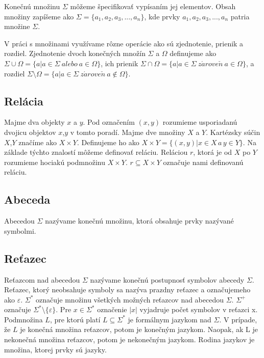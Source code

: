 Konečnú množinu $\Sigma$ môžeme špecifikovať vypísaním jej elementov. Obsah množiny zapíšeme ako $\Sigma = \{a_1, a_2, a_3, ..., a_n\}$, kde prvky $a_1, a_2, a_3, ..., a_n$ patria množine $\Sigma$.

V práci s množinami využívame rôzne operácie ako sú zjednotenie, prienik a rozdiel. Zjednotenie dvoch konečných množín $\Sigma$ a $\Omega$ definujeme ako $\Sigma \cup \Omega = \{a | a \in \Sigma \: alebo  \: a \in \Omega \}$, ich prienik $\Sigma \cap \Omega = \{a | a \in \Sigma \: z\acute{a}rove\check{n}  \: a \in \Omega \}$, a rozdiel $\Sigma \setminus \Omega = \{a | a \in \Sigma \: z\acute{a}rove\check{n}  \: a \not \in \Omega \}$.

\subsection{Relácia}
Majme dva objekty $x$ a $y$. Pod označením $(x,y)$ rozumieme usporiadanú dvojicu objektov $x$,$y$ v tomto poradí. Majme dve množiny $X$ a $Y$. Kartézsky súčin $X$,$Y$ značíme ako $X \times Y$. Definujeme ho ako $X \times Y = \{(x,y) | x \in X \, a \, y \in Y\}$. Na základe týchto znalostí môžeme definovať reláciu. Reláciou $r$, ktorá je od $X$ po $Y$ rozumieme hociakú podmnožinu $X \times Y$. $r \subseteq X \times Y$ označuje nami definovanú reláciu.

\subsection{Abeceda}
Abecedou $\Sigma$ nazývame konečnú množinu, ktorá obsahuje prvky nazývané symbolmi.

\subsection{Reťazec}
Reťazcom nad abecedou $\Sigma$ nazývame konečnú postupnosť symbolov abecedy $\Sigma$. Reťazec, ktorý neobsahuje symboly sa nazýva prazdny reťazec a označujemeho ako $\varepsilon$. $\Sigma^*$ označuje množinu všetkých možných reťazcov nad abecedou $\Sigma$. $\Sigma^+$ označuje $\Sigma^* \setminus \{\varepsilon\}$. Pre $x \in \Sigma^*$ označenie $|x|$ vyjadruje počet symbolov v reťazci x. Podmnožina $L$, pre ktorú platí $L \subseteq \Sigma^*$ je formálnym jazykom nad $\Sigma$. V prípade, že $L$ je konečná množina reťazcov, potom je konečným jazykom. Naopak, ak L je nekonečná množina reťazcov, potom je nekonečným jazykom. Rodina jazykov je množina, ktorej prvky sú jazyky.

